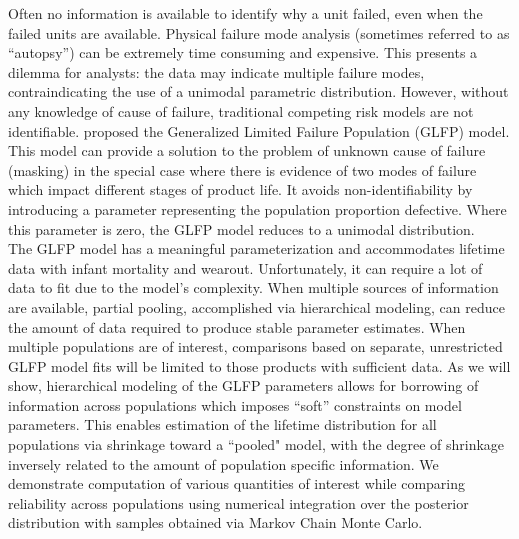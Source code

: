 \documentclass[12pt]{article}
\begin{document}
Often no information is available to identify why a unit failed, even when the failed units are available. Physical failure mode analysis (sometimes referred to as ``autopsy'') can be extremely time consuming and expensive. This presents a dilemma for analysts: the data may indicate multiple failure modes, contraindicating the use of a unimodal parametric distribution. However, without any knowledge of cause of failure, traditional competing risk models are not identifiable. \citet{chan} proposed the Generalized Limited Failure Population (GLFP) model. This model can provide a solution to the problem of unknown cause of failure (masking) in the special case where there is evidence of two modes of failure which impact different stages of product life. It avoids non-identifiability by introducing a parameter representing the population proportion defective. Where this parameter is zero, the GLFP model reduces to a unimodal distribution. \\

The GLFP model has a meaningful parameterization and accommodates lifetime data with infant mortality and wearout.  Unfortunately, it can require a lot of data to fit due to the model's complexity. When multiple sources of information are available, partial pooling, accomplished via hierarchical modeling, can reduce the amount of data required to produce stable parameter estimates. When multiple populations are of interest, comparisons based on separate, unrestricted GLFP model fits will be limited to those products with sufficient data. As we will show, hierarchical modeling of the GLFP parameters allows for borrowing of information across populations which imposes ``soft'' constraints on model parameters. This enables estimation of the lifetime distribution for all populations via shrinkage toward a ``pooled" model, with the degree of shrinkage inversely related to the amount of population specific information. We demonstrate computation of various quantities of interest while comparing reliability across populations using numerical integration over the posterior distribution with samples obtained via  Markov Chain Monte Carlo.
\end{document}
